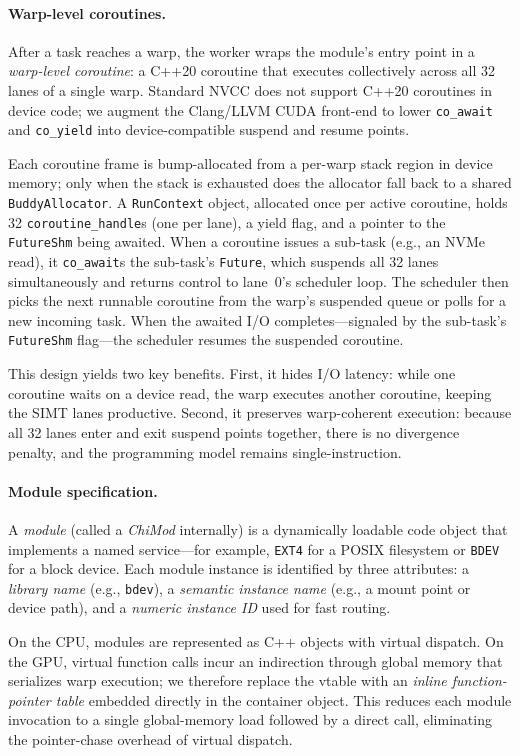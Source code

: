 \paragraph{Warp-level coroutines.}
After a task reaches a warp, the worker wraps the module's entry
point in a \emph{warp-level coroutine}: a C++20 coroutine that
executes collectively across all 32 lanes of a single warp.
Standard NVCC does not support C++20 coroutines in device code;
we augment the Clang/LLVM CUDA front-end to lower
\texttt{co\_await} and \texttt{co\_yield} into device-compatible
suspend and resume points.

Each coroutine frame is bump-allocated from a per-warp stack
region in device memory; only when the stack is exhausted does the
allocator fall back to a shared \texttt{BuddyAllocator}.
A \texttt{RunContext} object, allocated once per active coroutine,
holds 32 \texttt{coroutine\_handle}s (one per lane), a yield flag,
and a pointer to the \texttt{FutureShm} being awaited.
When a coroutine issues a sub-task (e.g., an NVMe read), it
\texttt{co\_await}s the sub-task's \texttt{Future}, which suspends
all 32 lanes simultaneously and returns control to lane~0's
scheduler loop.  The scheduler then picks the next runnable
coroutine from the warp's suspended queue or polls for a new
incoming task.  When the awaited I/O completes---signaled by the
sub-task's \texttt{FutureShm} flag---the scheduler resumes the
suspended coroutine.

This design yields two key benefits.
First, it hides I/O latency: while one coroutine waits on a
device read, the warp executes another coroutine, keeping the
SIMT lanes productive.
Second, it preserves warp-coherent execution: because all 32
lanes enter and exit suspend points together, there is no
divergence penalty, and the programming model remains
single-instruction.

\paragraph{Module specification.}
A \emph{module} (called a \emph{ChiMod} internally) is a dynamically
loadable code object that implements a named service---for example,
\texttt{EXT4} for a POSIX filesystem or \texttt{BDEV} for a block
device.  Each module instance is identified by three attributes: a
\emph{library name} (e.g., \texttt{bdev}), a \emph{semantic instance
name} (e.g., a mount point or device path), and a
\emph{numeric instance ID} used for fast routing.

On the CPU, modules are represented as C++ objects with virtual
dispatch.
On the GPU, virtual function calls incur an indirection through
global memory that serializes warp execution; we therefore replace
the vtable with an \emph{inline function-pointer table} embedded
directly in the container object.  This reduces each module
invocation to a single global-memory load followed by a direct
call, eliminating the pointer-chase overhead of virtual dispatch.

